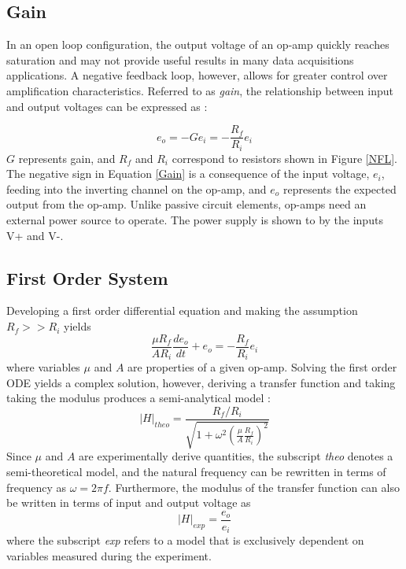 \documentclass[letterpaper,12pt]{article}
\begin{document}
\subsection{Gain}
In an open loop configuration, the output voltage of an op-amp quickly reaches saturation and may not provide useful results in many data acquisitions applications. A negative feedback loop, however, allows for greater control over amplification characteristics. Referred to as \textit{gain}, the relationship between input and output voltages can be expressed as :

\begin{equation}
    \label{Gain}
    e_o = -Ge_i = -\frac{R_f}{R_i}e_i
\end{equation}
$G$ represents gain, and $R_f$ and $R_i$ correspond to resistors shown in Figure \ref{NFL}. The negative sign in Equation \ref{Gain} is a consequence of the input voltage, $e_i$, feeding into the inverting channel on the op-amp, and $e_o$ represents the expected output from the op-amp. Unlike passive circuit elements, op-amps need an external power source to operate. The power supply is shown to by the inputs V+ and V-.

\subsection{First Order System}
Developing a first order differential equation and making the assumption $R_f >> R_i$ yields 
\begin{equation}
    \label{1stOrder}
    \frac{\mu R_f}{A R_i}\frac{de_o}{dt} + e_o = -\frac{R_f}{R_i}e_i 
\end{equation}
where variables $\mu$ and $A$ are properties of a given op-amp. Solving the first order ODE yields a complex solution, however, deriving a transfer function and taking taking the modulus produces a semi-analytical model : 
\begin{equation}
    \label{Htheo}
    |H|_{theo} = \frac{R_f/R_i}{\sqrt{1 + \omega^2(\frac{\mu}{A}\frac{R_f}{R_i})^2}}
\end{equation}
Since $\mu$ and $A$ are experimentally derive quantities, the subscript \textit{theo} denotes a semi-theoretical model, and the natural frequency can be rewritten in terms of frequency as $\omega = 2\pi f$. Furthermore, the modulus of the transfer function can also be written in terms of input and output voltage as
\begin{equation}
    \label{Hexp}
    |H|_{exp} = \frac{e_o}{e_i}
\end{equation}
where the subscript \textit{exp} refers to a model that is exclusively dependent on variables measured during the experiment.
\end{document}
